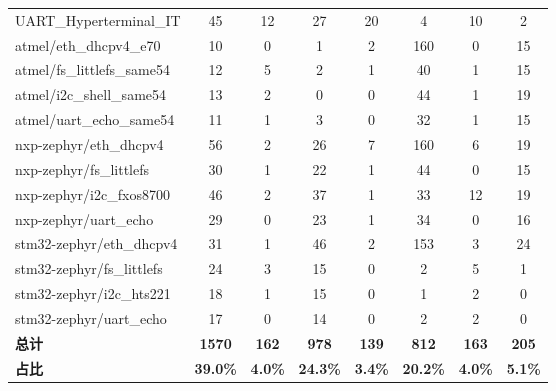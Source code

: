 \begin{table}[H]
\begin{adjustbox}{max width=\textwidth}
\begin{tabular}{lccccccc}
UART\_Hyperterminal\_IT & 45 & 12 & 27 & 20 & 4 & 10 & 2 \\
atmel/eth\_dhcpv4\_e70 & 10 & 0 & 1 & 2 & 160 & 0 & 15 \\
atmel/fs\_littlefs\_same54 & 12 & 5 & 2 & 1 & 40 & 1 & 15 \\
atmel/i2c\_shell\_same54 & 13 & 2 & 0 & 0 & 44 & 1 & 19 \\
atmel/uart\_echo\_same54 & 11 & 1 & 3 & 0 & 32 & 1 & 15 \\
nxp-zephyr/eth\_dhcpv4 & 56 & 2 & 26 & 7 & 160 & 6 & 19 \\
nxp-zephyr/fs\_littlefs & 30 & 1 & 22 & 1 & 44 & 0 & 15 \\
nxp-zephyr/i2c\_fxos8700 & 46 & 2 & 37 & 1 & 33 & 12 & 19 \\
nxp-zephyr/uart\_echo & 29 & 0 & 23 & 1 & 34 & 0 & 16 \\
stm32-zephyr/eth\_dhcpv4 & 31 & 1 & 46 & 2 & 153 & 3 & 24 \\
stm32-zephyr/fs\_littlefs & 24 & 3 & 15 & 0 & 2 & 5 & 1 \\
stm32-zephyr/i2c\_hts221 & 18 & 1 & 15 & 0 & 1 & 2 & 0 \\
stm32-zephyr/uart\_echo & 17 & 0 & 14 & 0 & 2 & 2 & 0 \\
\midrule
\textbf{总计} & \textbf{1570} & \textbf{162} & \textbf{978} & \textbf{139} & \textbf{812} & \textbf{163} & \textbf{205} \\
\midrule
\textbf{占比} & \textbf{39.0\%} & \textbf{4.0\%} & \textbf{24.3\%} & \textbf{3.4\%} & \textbf{20.2\%} & \textbf{4.0\%} & \textbf{5.1\%} \\
\bottomrule
\end{tabular}
\end{adjustbox}
\end{table}

